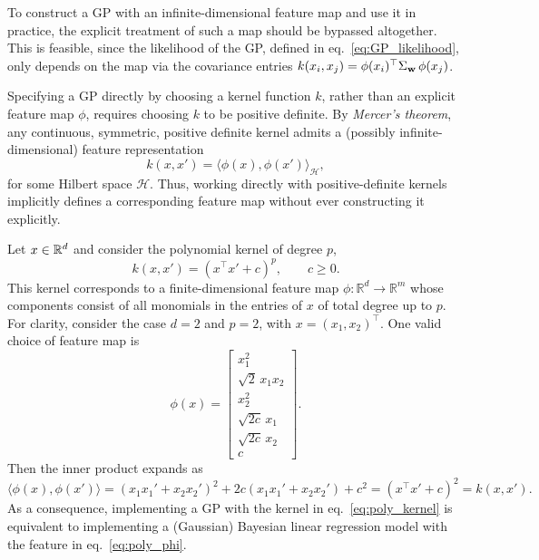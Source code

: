 To construct a GP with an infinite-dimensional feature map and use it in practice, the explicit treatment of such a map should be bypassed altogether. This is feasible, since the likelihood of the GP, defined in eq.~\eqref{eq:GP_likelihood}, only depends on the map via the covariance entries $k(x_i,x_j)=\phi(x_i)^\top \Sigma_{{ \mathbf{w}}}\,\phi(x_j)$. 

\begin{remark}
Specifying a GP directly by choosing a kernel function \(k\), rather than an explicit feature map \(\phi\), requires  choosing \(k\) to be positive definite.
By \emph{Mercer’s theorem}, any continuous, symmetric, positive definite kernel admits a (possibly infinite-dimensional) feature representation
\[
k(x,x')=\langle \phi(x),\phi(x')\rangle_{\mathcal H},
\]
for some Hilbert space \(\mathcal H\).
Thus, working directly with positive-definite kernels implicitly defines a corresponding feature map without ever constructing it explicitly.
\end{remark}

\begin{example}
Let \(x\in{\mathbb R}^d\) and consider the polynomial kernel of degree \(p\),
\begin{equation}
    k(x,x') = (x^\top x' + c)^p ,
\qquad c \ge 0.    
\label{eq:poly_kernel}
\end{equation}
This kernel corresponds to a finite-dimensional feature map \(\phi:\mathbb R^d\to\mathbb R^m\)
whose components consist of all monomials in the entries of \(x\) of total degree up to \(p\).
For clarity, consider the case \(d=2\) and \(p=2\), with \(x=(x_1,x_2)^\top\).
One valid choice of feature map is
\begin{equation}\label{eq:poly_phi}
    \phi(x)=
\begin{bmatrix}
x_1^2\\
\sqrt{2}\,x_1x_2\\
x_2^2\\
\sqrt{2c}\,x_1\\
\sqrt{2c}\,x_2\\
c
\end{bmatrix}.    
\end{equation}
Then the inner product expands as
\[
\langle \phi(x),\phi(x')\rangle
=
(x_1x_1'+x_2x_2')^2 + 2c(x_1x_1'+x_2x_2') + c^2
=
(x^\top x' + c)^2
=
k(x,x').
\]
As a consequence, implementing a GP with the kernel in eq.~\eqref{eq:poly_kernel} is equivalent to implementing a (Gaussian) Bayesian linear regression model with the feature in eq.~\eqref{eq:poly_phi}.
\end{example}




